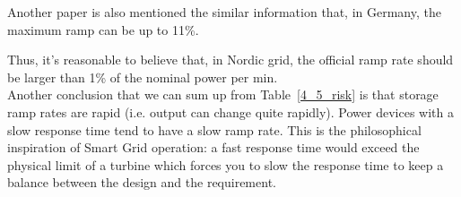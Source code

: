 Another paper is also mentioned the similar information that, in Germany, \cite{huber2017flexibility} the maximum ramp can be up to 11\%.

Thus, it's reasonable to believe that, in Nordic grid, the official ramp rate should be larger than 1\% of the nominal power per min.\\


Another conclusion that we can sum up from Table~\ref{4_5_risk} is that storage ramp rates are rapid (i.e. output can change quite rapidly). Power devices with a slow response time tend to have a slow ramp rate. This is the philosophical inspiration of Smart Grid operation: a fast response time would exceed the physical limit of a turbine which forces you to slow the response time to keep a balance between the design and the requirement.\\